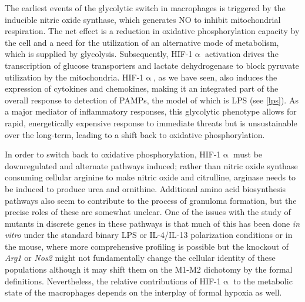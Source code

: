 The earliest events of the glycolytic switch in macrophages is triggered by the inducible nitric oxide synthase, which generates NO to inhibit mitochondrial respiration. The net effect is a reduction in oxidative phosphorylation capacity by the cell and a need for the utilization of an alternative mode of metabolism, which is supplied by glycolysis. Subsequently, HIF-1$\upalpha$ activation drives the transcription of glucose transporters and lactate dehydrogenase to block pyruvate utilization by the mitochondria. HIF-1$\upalpha$, as we have seen, also induces the expression of cytokines and chemokines, making it an integrated part of the overall response to detection of PAMPs, the model of which is LPS (see \autoref{lps}). As a major mediator of inflammatory responses, this glycolytic phenotype allows for rapid, energetically expensive response to immediate threats but is unsustainable over the long-term, leading to a shift back to oxidative phosphorylation.

In order to switch back to oxidative phosphorylation, HIF-1$\upalpha$ must be downregulated and alternate pathways induced; rather than nitric oxide synthase consuming cellular arginine to make nitric oxide and citrulline, arginase needs to be induced to produce urea and ornithine. Additional amino acid biosynthesis pathways also seem to contribute to the process of granuloma formation, but the precise roles of these are somewhat unclear. One of the issues with the study of mutants in discrete genes in these pathways is that much of this has been done \textit{in vitro} under the standard binary LPS or IL-4/IL-13 polarization conditions or in the mouse, where more comprehensive profiling is possible but the knockout of \textit{Arg1} or \textit{Nos2} might not fundamentally change the cellular identity of these populations although it may shift them on the M1-M2 dichotomy by the formal definitions. Nevertheless, the relative contributions of HIF-1$\upalpha$ to the metabolic state of the macrophages depends on the interplay of formal hypoxia as well. 

